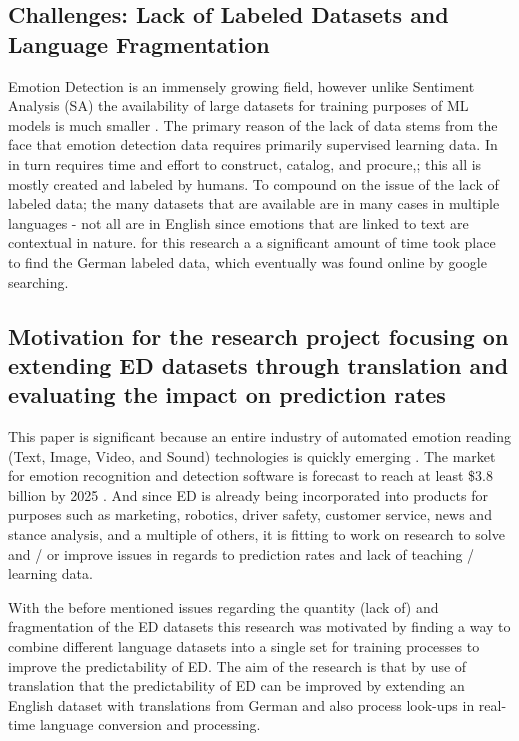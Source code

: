\documentclass[11pt]{article}
\begin{document}
\subsection{Challenges: Lack of Labeled Datasets and Language Fragmentation}
Emotion Detection is an immensely growing field, however unlike Sentiment Analysis (SA) the availability of large datasets for training purposes of ML models is much smaller \cite{ACLU-ED-Data, ai-framework-detection-emotions}. The primary reason of the lack of data stems from the face that emotion detection data requires primarily supervised learning data. In in turn requires time and effort to construct, catalog, and procure,; this all is mostly created and labeled by humans. To compound on the issue of the lack of labeled data; the many datasets that are available are in many cases in multiple languages - not all are in English since emotions that are linked to text are contextual in nature. for this research a a significant amount of time took place to find the German labeled data, which eventually was found online by google searching.

\subsection{Motivation for the research project focusing on extending ED datasets through translation and evaluating the impact on prediction rates}

This paper is significant because an entire industry of automated emotion reading (Text, Image, Video, and Sound) technologies is quickly emerging \cite{ACLU-ED-Data, ACLU-THE-DAWN-OF-ROBOT-SURVEILLANCE}. The market for emotion recognition and detection software is forecast to reach at least \$3.8 billion by 2025 \cite{ACLU-ED-Data, ACLU-THE-DAWN-OF-ROBOT-SURVEILLANCE}. And since ED is already being incorporated into products for purposes such as marketing, robotics, driver safety, customer service, news and stance analysis, and a multiple of others, it is fitting to work on research to solve and / or improve issues in regards to prediction rates and lack of teaching / learning data.

With the before mentioned issues regarding the quantity (lack of) and fragmentation of the ED datasets this research was motivated by finding a way to combine different language datasets into a single set for training processes to improve the predictability of ED. The aim of the research is that by use of translation that the predictability of ED can be improved by extending an English dataset with translations from German and also process look-ups in real-time language conversion and processing.
\end{document}
